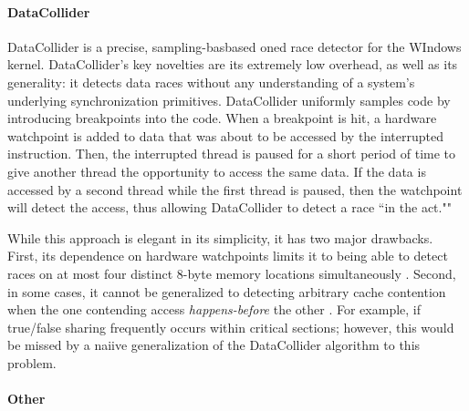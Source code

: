 \documentclass[letterpaper,twocolumn,10pt]{article}
\newcommand{\TextToolname}{Malcontent}
\newcommand{\Toolname}{\textsc{\TextToolname{}}}
\begin{document}
\paragraph{DataCollider}
DataCollider \cite{DataCollider} is a precise, sampling-basbased oned race detector for the WIndows kernel. DataCollider's key
novelties are its extremely low overhead, as well as its generality: it detects data races without any understanding of
a system's underlying synchronization primitives. DataCollider uniformly samples code by introducing breakpoints into the code.
When a breakpoint is hit, a hardware watchpoint is added to data that was about to be accessed by the interrupted instruction.
Then, the interrupted thread is paused for a short period of time to give another thread the opportunity to access the
same data. If the data is accessed by a second thread while the first thread is paused, then the watchpoint will detect the
access, thus allowing DataCollider to detect a race ``in the act."" 

While this approach is elegant in its simplicity, it has two major drawbacks. First, its dependence on hardware watchpoints
limits it to being able to detect races on at most four distinct 8-byte memory locations simultaneously \cite{IntelSDManual}.
Second, in some cases, it cannot be generalized to detecting arbitrary cache contention when the one contending access
\emph{happens-before} the other \cite{VectorClocks}. For example, if true/false sharing frequently occurs within critical sections;
however, this would be missed by a naiive generalization of the DataCollider algorithm to this problem.



\paragraph{Other}

\end{document}
